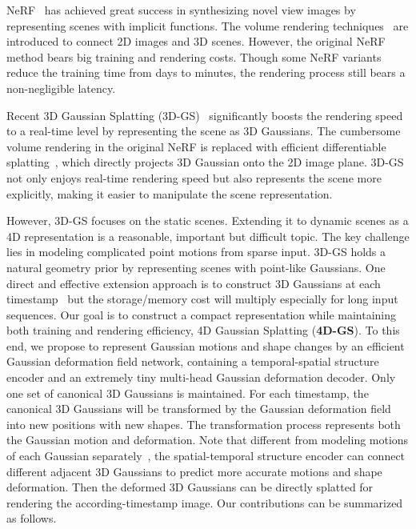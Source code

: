 \documentclass[10pt,twocolumn,letterpaper]{article}
\begin{document}
NeRF~\cite{mildenhall2021nerf} has achieved great success in synthesizing novel view images by representing scenes with implicit functions. The volume rendering techniques~\cite{drebin1988volume} are introduced to connect 2D images and 3D scenes. However, the original NeRF method bears big training and rendering costs. Though some NeRF variants~\cite{dvgo,tineuvox,hexplane,kplanes,tensor4d,fridovich2022plenoxels,instantngp} reduce the training time from days to minutes, the rendering process still bears a non-negligible latency.

Recent 3D Gaussian Splatting (3D-GS)~\cite{3dgs} significantly boosts the rendering speed to a real-time level by representing the scene as 3D Gaussians. The cumbersome volume rendering in the original NeRF is replaced with efficient differentiable splatting~\cite{yifan2019differentiablesplatting}, which directly projects 3D Gaussian onto the 2D image plane. 3D-GS not only enjoys real-time rendering speed but also represents the scene more explicitly, making it easier to manipulate the scene representation. 

However, 3D-GS focuses on the static scenes. Extending it to dynamic scenes as a 4D representation is a reasonable, important but difficult topic. The key challenge lies in modeling complicated point motions from sparse input. 3D-GS holds a natural geometry prior by representing scenes with point-like Gaussians. One direct and effective extension approach is to construct 3D Gaussians at each timestamp~\cite{dynamic3dgs} but the storage/memory cost will multiply especially for long input sequences. Our goal is to construct a compact representation while maintaining both training and rendering efficiency, \ie 4D Gaussian Splatting (\textbf{4D-GS}). To this end, we propose to represent Gaussian motions and shape changes by an efficient Gaussian deformation field network, containing a temporal-spatial structure encoder and an extremely tiny multi-head Gaussian deformation decoder. Only one set of canonical 3D Gaussians is maintained. For each timestamp, the canonical 3D Gaussians will be transformed by the Gaussian deformation field into new positions with new shapes. The transformation process represents both the Gaussian motion and deformation. Note that different from modeling motions of each Gaussian separately~\cite{dynamic3dgs,4dgs-2}, the spatial-temporal structure encoder can connect different adjacent 3D Gaussians to predict more accurate motions and shape deformation. Then the deformed 3D Gaussians can be directly splatted for rendering the according-timestamp image. Our contributions can be summarized as follows.
\end{document}
